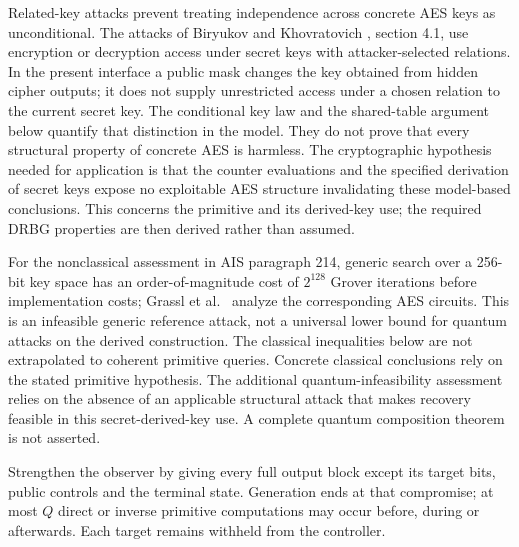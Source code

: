 \documentclass[journal=tosc,preprint,floatrow,nohyperxmp]{iacrtrans}
\newif\ifjordireview
\newcounter{jordinote}
\newcommand{\jordinote}[2]{%
  \ifjordireview
  \stepcounter{jordinote}\par\medskip\noindent
  \fcolorbox{blue!55!black}{blue!4}{%
    \begin{minipage}{\dimexpr\linewidth-2\fboxsep-2\fboxrule\relax}
    \small\raggedright\color{blue!45!black}
    \textbf{Solo Jordi -- J\thejordinote: #1}\par\smallskip
    #2
    \end{minipage}}\par\medskip
  \fi
}
\numberwithin{lemma}{section}
\numberwithin{proposition}{section}
\numberwithin{equation}{section}
\theoremstyle{definition}
\numberwithin{definition}{section}
\theoremstyle{plain}
\begin{document}
Related-key attacks prevent treating independence across concrete AES keys as unconditional. The attacks of Biryukov and Khovratovich \cite{relatedkey}, section 4.1, use encryption or decryption access under secret keys with attacker-selected relations. In the present interface a public mask changes the key obtained from hidden cipher outputs; it does not supply unrestricted access under a chosen relation to the current secret key. The conditional key law and the shared-table argument below quantify that distinction in the model. They do not prove that every structural property of concrete AES is harmless. The cryptographic hypothesis needed for application is that the counter evaluations and the specified derivation of secret keys expose no exploitable AES structure invalidating these model-based conclusions. This concerns the primitive and its derived-key use; the required DRBG properties are then derived rather than assumed.

For the nonclassical assessment in AIS paragraph 214, generic search over a 256-bit key space has an order-of-magnitude cost of $2^{128}$ Grover iterations before implementation costs; Grassl et al.\ \cite{grassl} analyze the corresponding AES circuits. This is an infeasible generic reference attack, not a universal lower bound for quantum attacks on the derived construction. The classical inequalities below are not extrapolated to coherent primitive queries. Concrete classical conclusions rely on the stated primitive hypothesis. The additional quantum-infeasibility assessment relies on the absence of an applicable structural attack that makes recovery feasible in this secret-derived-key use. A complete quantum composition theorem is not asserted.

\jordinote{Hipótesis sobre AES, no sobre la conclusión}{Modelamos cada clave mediante una permutación ideal independiente, reutilizando la misma tabla cuando se repite la clave. No suponemos que el DRBG ya sea seguro ni que Update sea una función aleatoria independiente: las ternas de contadores vecinos comparten bloques. La revisión debe vigilar que ninguna independencia posterior contradiga estas dependencias.}

Strengthen the observer by giving every full output block except its target bits, public controls and the terminal state. Generation ends at that compromise; at most $Q$ direct or inverse primitive computations may occur before, during or afterwards. Each target remains withheld from the controller.
\end{document}
